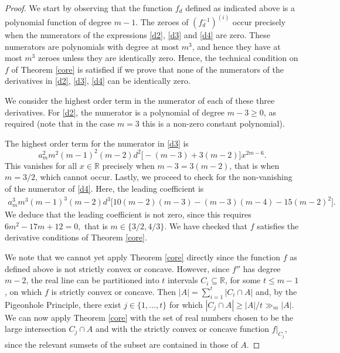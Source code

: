 \documentclass[10pt,a4paper]{amsart}
\newcommand{\R}{\mathbb{R}}
\begin{document}
\begin{proof}
    We start by observing that the function $f_d$ defined as indicated above is a polynomial function of degree $m-1$. The zeroes of $(f_d^{-1})^{(i)}$ occur precisely when the numerators of the expressions \eqref{d2}, \eqref{d3} and \eqref{d4} are zero. These numerators are polynomials with degree at most $m^3$, and hence they have at most $m^3$ zeroes unless they are identically zero. Hence, the technical condition on $f$ of Theorem \ref{core} is satisfied if we prove that none of the numerators of the derivatives in \eqref{d2}, \eqref{d3}, \eqref{d4} can be identically zero. 
    
    We consider the highest order term in the numerator of each of these three derivatives. For \eqref{d2}, the numerator is a polynomial of degree $m-3 \geq 0$, as required (note that in the case $m=3$ this is a non-zero constant polynomial). 

    The highest order term for the numerator in \eqref{d3} is 
     \begin{equation*}
        a_m^2m^2(m-1)^2(m-2)d^2\Big[-(m-3)+3(m-2)\Big]x^{2m-6}.
    \end{equation*}
    This vanishes for all $x\in \R$ precisely when $m-3=3(m-2)$, that is when $m=3/2$, which cannot occur. Lastly, we proceed to check for the non-vanishing of the numerator of \eqref{d4}. Here, the leading coefficient is \begin{equation*}
        \begin{split}
            a_m^3m^3(m-1)^3(m-2)d^3\Big[10(m-2)(m-3)-(m-3)(m-4)-15(m-2)^2\Big].
        \end{split}
    \end{equation*}
    We deduce that the leading coefficient is not zero, since this requires $6m^2-17m+12=0,$ that is $m\in\{3/2,4/3\}$. We have checked that $f$ satisfies the derivative conditions of Theorem \ref{core}. 
    
    We note that we cannot yet apply Theorem \ref{core} directly since the function $f$ as defined above is not strictly convex or concave. However, since $f''$ has degree $m-2$, the real line can be partitioned into $t$ intervals $C_i\subseteq\R$, for some $t\le m-1$, on which $f$ is strictly convex or concave. Then $|A|=\sum_{i=1}^t|C_i\cap A|$ and, by the Pigeonhole Principle, there exist $j\in\{1,\dotsc,t\}$ for which $|C_j\cap A|\ge|A|/t\gg_m|A|.$ We can now apply Theorem \ref{core} with the set of real numbers chosen to be the large intersection $C_j\cap A$ and with the strictly convex or concave function $f\big|_{C_j}$, since the relevant sumsets of the subset are contained in those of $A.$
\end{proof}
\end{document}
